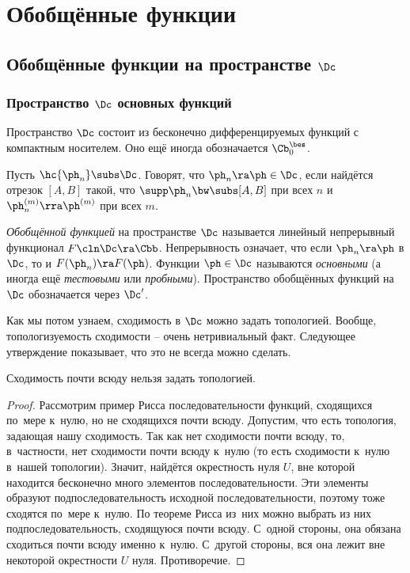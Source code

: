 \documentclass[a4paper]{article}
\begin{document}
\section{Обобщённые функции}

\subsection{Обобщённые функции на пространстве $\Dc$}

\subsubsection{Пространство $\Dc$ основных функций}

\begin{df}
Пространство $\Dc$ состоит из бесконечно дифференцируемых функций с компактным носителем.
Оно ещё иногда обозначается $\Cb^\bes_0$.
\end{df}

\begin{df}
Пусть $ \hc{\ph_n} \subs \Dc$. Говорят, что $\ph_n \ra \ph \in \Dc$, если найдётся отрезок $[A,B]$ такой,
что $\supp \ph_n \bw\subs [A,B]$ при всех $n$ и $\ph_n^{(m)} \rra \ph^{(m)}$ при всех $m$.
\end{df}

\begin{df}
\emph{Обобщённой функцией} на пространстве $\Dc$ называется линейный непрерывный функционал $F\cln \Dc \ra \Cbb$.
Непрерывность означает, что если $\ph_n \ra \ph$ в $\Dc$, то и $F(\ph_n) \ra F(\ph)$. Функции $\ph\in\Dc$
называются \emph{основными} (а иногда ещё \emph{тестовыми} или \emph{пробными}).
Пространство обобщённых функций на $\Dc$ обозначается через $\Dc'$.
\end{df}

Как мы потом узнаем, сходимость в $\Dc$ можно задать топологией. Вообще, топологизуемость сходимости -- очень
нетривиальный факт. Следующее утверждение показывает, что это не всегда можно сделать.

\begin{stm}
Сходимость почти всюду нельзя задать топологией.
\end{stm}
\begin{proof}
Рассмотрим пример Рисса последовательности функций, сходящихся по~мере к~нулю,
но не сходящихся почти всюду. Допустим, что есть топология, задающая нашу сходимость.
Так как нет сходимости почти всюду, то, в~частности, нет сходимости почти всюду к~нулю (то есть
сходимости к~нулю в~нашей топологии). Значит, найдётся окрестность нуля $U$,  вне которой находится
бесконечно много элементов последовательности. Эти элементы образуют подпоследовательность
исходной последовательности, поэтому тоже сходятся по~мере к~нулю. По теореме Рисса из~них можно выбрать
из них подпоследовательность, сходящуюся почти всюду. С~одной стороны, она обязана сходиться почти всюду
именно к~нулю. С~другой стороны, вся она лежит вне некоторой окрестности $U$ нуля. Противоречие.
\end{proof}
\end{document}
